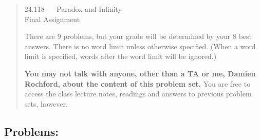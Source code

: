 \documentclass[12pt,a4paper]{article}
\begin{document}
\begin{quote}

\begin{center} {\large 24.118 --- Paradox and Infinity \\ \vspace{1mm}}
 {\large Final Assignment \\ \vspace{1mm}}
 
\end{center}
\vspace{3mm}

\noindent There are 9 problems, but your grade will be determined by your 8 best answers. There is no word limit unless otherwise specified. (When a word limit
is specified, words after the word limit will be ignored.)

\textbf{You may not talk with anyone, other than a TA or me, Damien Rochford, about the content of this problem set.} You are free to access the class lecture notes, readings and answers to previous problem sets, however.

\end{quote}

\vspace{3mm}


\subsection*{Problems:}
\end{document}
